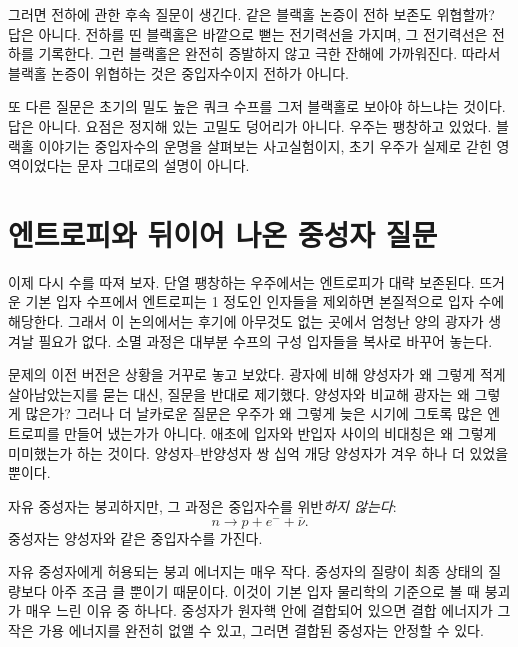 그러면 전하에 관한 후속 질문이 생긴다. 같은 블랙홀 논증이 전하 보존도 위협할까? 답은 아니다. 전하를 띤 블랙홀은 바깥으로 뻗는 전기력선을 가지며, 그 전기력선은 전하를 기록한다. 그런 블랙홀은 완전히 증발하지 않고 극한 잔해에 가까워진다. 따라서 블랙홀 논증이 위협하는 것은 중입자수이지 전하가 아니다.

또 다른 질문은 초기의 밀도 높은 쿼크 수프를 그저 블랙홀로 보아야 하느냐는 것이다. 답은 아니다. 요점은 정지해 있는 고밀도 덩어리가 아니다. 우주는 팽창하고 있었다. 블랙홀 이야기는 중입자수의 운명을 살펴보는 사고실험이지, 초기 우주가 실제로 갇힌 영역이었다는 문자 그대로의 설명이 아니다.

\begin{classroomqa}
\end{classroomqa}

\section{엔트로피와 뒤이어 나온 중성자 질문}

이제 다시 수를 따져 보자. 단열 팽창하는 우주에서는 엔트로피가 대략 보존된다. 뜨거운 기본 입자 수프에서 엔트로피는 1 정도인 인자들을 제외하면 본질적으로 입자 수에 해당한다. 그래서 이 논의에서는 후기에 아무것도 없는 곳에서 엄청난 양의 광자가 생겨날 필요가 없다. 소멸 과정은 대부분 수프의 구성 입자들을 복사로 바꾸어 놓는다.

문제의 이전 버전은 상황을 거꾸로 놓고 보았다. 광자에 비해 양성자가 왜 그렇게 적게 살아남았는지를 묻는 대신, 질문을 반대로 제기했다. 양성자와 비교해 광자는 왜 그렇게 많은가? 그러나 더 날카로운 질문은 우주가 왜 그렇게 늦은 시기에 그토록 많은 엔트로피를 만들어 냈는가가 아니다. 애초에 입자와 반입자 사이의 비대칭은 왜 그렇게 미미했는가 하는 것이다. 양성자--반양성자 쌍 십억 개당 양성자가 겨우 하나 더 있었을 뿐이다.

자유 중성자는 붕괴하지만, 그 과정은 중입자수를 위반\emph{하지 않는다}:
\[
n \to p + e^- + \bar\nu.
\]
중성자는 양성자와 같은 중입자수를 가진다.

자유 중성자에게 허용되는 붕괴 에너지는 매우 작다. 중성자의 질량이 최종 상태의 질량보다 아주 조금 클 뿐이기 때문이다. 이것이 기본 입자 물리학의 기준으로 볼 때 붕괴가 매우 느린 이유 중 하나다. 중성자가 원자핵 안에 결합되어 있으면 결합 에너지가 그 작은 가용 에너지를 완전히 없앨 수 있고, 그러면 결합된 중성자는 안정할 수 있다.

\begin{classroomqa}
\end{classroomqa}
